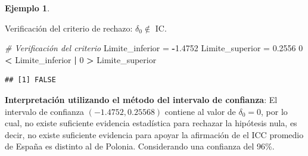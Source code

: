 \documentclass[
  11pt,
]{book}
\newenvironment{Shaded}{\begin{snugshade}}{\end{snugshade}}
\newcommand{\CommentTok}[1]{\textcolor[rgb]{0.56,0.35,0.01}{\textit{#1}}}
\newcommand{\DecValTok}[1]{\textcolor[rgb]{0.00,0.00,0.81}{#1}}
\newcommand{\FloatTok}[1]{\textcolor[rgb]{0.00,0.00,0.81}{#1}}
\newcommand{\NormalTok}[1]{#1}
\newcommand{\OtherTok}[1]{\textcolor[rgb]{0.56,0.35,0.01}{#1}}
\newcommand{\SpecialCharTok}[1]{\textcolor[rgb]{0.81,0.36,0.00}{\textbf{#1}}}
\theoremstyle{definition}
\theoremstyle{definition}
\newtheorem{example}{Ejemplo}[chapter]
\theoremstyle{definition}
\theoremstyle{definition}
\theoremstyle{remark}
\begin{document}
\begin{example}
\begin{enumerate}
  Verificación del criterio de rechazo: \(\delta_0 \notin\) IC.

\begin{Shaded}
\begin{Highlighting}[]
\CommentTok{\# Verificación del criterio}
\NormalTok{Limite\_inferior }\OtherTok{=} \SpecialCharTok{{-}}\FloatTok{1.4752}
\NormalTok{Limite\_superior }\OtherTok{=} \FloatTok{0.2556}
\DecValTok{0} \SpecialCharTok{\textless{}}\NormalTok{ Limite\_inferior }\SpecialCharTok{|} \DecValTok{0} \SpecialCharTok{\textgreater{}}\NormalTok{ Limite\_superior}
\end{Highlighting}
\end{Shaded}

\begin{verbatim}
## [1] FALSE
\end{verbatim}

  \textbf{Interpretación utilizando el método del intervalo de confianza}: El intervalo de confianza \((-1.4752, 0.25568)\) contiene al valor de \(\delta_0 = 0\), por lo cual, no existe suficiente evidencia estadística para rechazar la hipótesis nula, es decir, no existe suficiente evidencia para apoyar la afirmación de el ICC promedio de España es distinto al de Polonia. Considerando una confianza del 96\%.
\end{enumerate}

\end{example}
\end{document}
